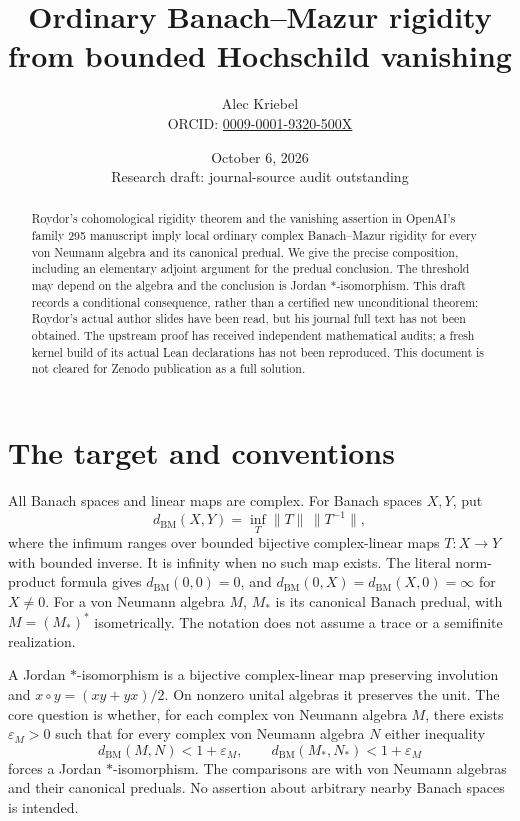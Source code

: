 \documentclass[11pt]{article}
\title{Ordinary Banach--Mazur rigidity from bounded Hochschild vanishing}
\author{Alec Kriebel\\\small ORCID: \href{https://orcid.org/0009-0001-9320-500X}{0009-0001-9320-500X}}
\date{October 6, 2026\\\small Research draft: journal-source audit outstanding}
\newcommand{\BM}{d_{\mathrm{BM}}}
\begin{document}
\maketitle
\begin{abstract}
Roydor's cohomological rigidity theorem and the vanishing assertion in
OpenAI's family 295 manuscript imply local ordinary complex
Banach--Mazur rigidity for every von Neumann algebra and its canonical
predual. We give the precise composition, including an elementary
adjoint argument for the predual conclusion. The threshold may depend on
the algebra and the conclusion is Jordan $*$-isomorphism. This draft
records a conditional consequence, rather than a certified new
unconditional theorem: Roydor's actual author slides have been read,
but his journal full text has not been obtained. The upstream proof
has received independent mathematical audits; a fresh kernel build
of its actual Lean declarations has not been reproduced. This
document is not cleared for Zenodo publication as a full solution.
\end{abstract}

\section{The target and conventions}

All Banach spaces and linear maps are complex. For Banach spaces $X,Y$, put
\[
 \BM(X,Y)=\inf_T \|T\|\,\|T^{-1}\|,
\]
where the infimum ranges over bounded bijective complex-linear maps
$T:X\to Y$ with bounded inverse. It is infinity when no such map
exists. The literal norm-product formula gives $\BM(0,0)=0$, and
$\BM(0,X)=\BM(X,0)=\infty$ for
$X\ne0$. For a von Neumann algebra $M$, $M_*$ is its canonical
Banach predual, with $M=(M_*)^*$ isometrically. The notation does
not assume a trace or a semifinite realization.

A Jordan $*$-isomorphism is a bijective complex-linear map preserving
involution and $x\circ y=(xy+yx)/2$. On nonzero unital algebras it
preserves the unit. The core question is whether, for each complex
von Neumann algebra $M$, there exists $\varepsilon_M>0$ such that
for every complex von Neumann algebra $N$ either inequality
\begin{equation}\label{eq:targets}
 \BM(M,N)<1+\varepsilon_M,
 \qquad \BM(M_*,N_*)<1+\varepsilon_M
\end{equation}
forces a Jordan $*$-isomorphism. The comparisons are with von Neumann
algebras and their canonical preduals. No assertion about arbitrary
nearby Banach spaces is intended.
\end{document}
